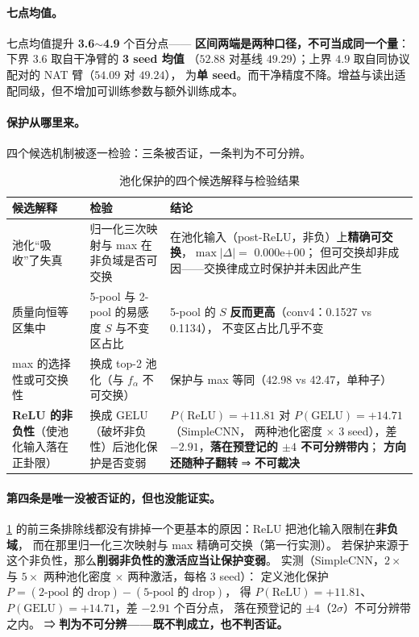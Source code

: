 \documentclass[11pt,a4paper]{ctexart}
\begin{document}
\paragraph{七点均值。}
七点均值提升 \textbf{3.6$\sim$4.9} 个百分点——
\textbf{区间两端是两种口径，不可当成同一个量}：下界 $3.6$ 取自干净臂的 \textbf{3 seed 均值}
（$52.88$ 对基线 $49.29$）；上界 $4.9$ 取自同协议配对的 NAT 臂（$54.09$ 对 $49.24$），
为\textbf{单 seed}。而干净精度不降。增益与读出适配同级，但不增加可训练参数与额外训练成本。

\paragraph{保护从哪里来。}
四个候选机制被逐一检验：三条被否证，一条判为不可分辨。

\begin{table}[t]
\centering
\caption{池化保护的四个候选解释与检验结果}
\label{tab:pool}
\small
\begin{tabular}{p{2.6cm}p{4.4cm}p{6.4cm}}
\toprule
候选解释 & 检验 & 结论 \\
\midrule
池化“吸收”了失真
& 归一化三次映射与 max 在非负域是否可交换
& 在池化输入（post-ReLU，非负）上\textbf{精确可交换}，$\max|\Delta|=$ 0.000e+00；
  但可交换却非成因——交换律成立时保护并未因此产生 \\[2pt]
质量向恒等区集中
& 5-pool 与 2-pool 的易感度 $S$ 与不变区占比
& 5-pool 的 $S$ \textbf{反而更高}（conv4：0.1527 vs 0.1134），
  不变区占比几乎不变 \\[2pt]
max 的选择性或可交换性
& 换成 top-2 池化（与 $f_\alpha$ 不可交换）
& 保护与 max 等同（42.98 vs 42.47，单种子） \\[2pt]
\textbf{ReLU 的非负性}（使池化输入落在正卦限）
& 换成 GELU（破坏非负性）后池化保护是否变弱
& $P(\text{ReLU})=+11.81$ 对 $P(\text{GELU})=+14.71$（SimpleCNN，
  两种池化密度 $\times$ 3 seed），差 $-2.91$，\textbf{落在预登记的 $\pm4$ 不可分辨带内}；
  \textbf{方向还随种子翻转} ⇒ \textbf{不可裁决} \\
\bottomrule
\end{tabular}
\end{table}

\paragraph{第四条是唯一没被否证的，但也没能证实。}
\cref{tab:pool} 的前三条排除线都没有排掉一个更基本的原因：ReLU 把池化输入限制在\textbf{非负域}，
而在那里归一化三次映射与 max 精确可交换（第一行实测）。
若保护来源于这个非负性，那么\textbf{削弱非负性的激活应当让保护变弱}。
实测（SimpleCNN，$2\times$ 与 $5\times$ 两种池化密度 $\times$ 两种激活，每格 3 seed）：
定义池化保护 $P=(\text{2-pool 的 drop})-(\text{5-pool 的 drop})$，
得 $P(\text{ReLU})=+11.81$、$P(\text{GELU})=+14.71$，差 $-2.91$ 个百分点，
落在预登记的 $\pm4$（$2\sigma$）不可分辨带之内。
⇒ \textbf{判为不可分辨——既不判成立，也不判否证。}
\end{document}
